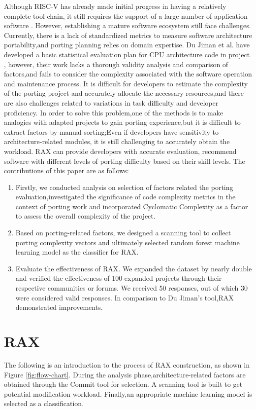 \documentclass[sigconf,screen,review]{acmart}
\begin{document}
Although RISC-V has already made initial progress in having a relatively complete tool chain, it still requires the support of a large number of application software \cite{2019Notary}.
However, establishing a mature software ecosystem still face challenges.
Currently, there is a lack of standardized metrics to measure software architecture portability,and porting planning relies on domain expertise.
Du Jiman et al. have developed a basic statistical evaluation plan for CPU architecture code in project \cite{2023du}, however, their work lacks a thorough validity analysis and comparison of factors,and fails to consider the complexity associated with the software operation and maintenance process.
It is difficult for developers to estimate the complexity of the porting project and accurately allocate the necessary resources,and there are also challenges related to variations in task difficulty and developer proficiency.
In order to solve this problem,one of the methods is to make analogies with adapted projects to gain porting experience,but it is difficult to extract factors by manual sorting;Even if developers have sensitivity to architecture-related modules, it is still challenging to accurately obtain the workload.
RAX can provide developers with accurate evaluation, recommend software with different levels of porting difficulty based on their skill levels.
The contributions of this paper are as follows:
\begin{enumerate}
  \item Firstly, we conducted analysis on selection of factors related the porting evaluation,investigated the significance of code complexity metrics in the context of porting work and incorporated Cyclomatic Complexity as a factor to assess the overall complexity of  the project.
  \item Based on porting-related factors, we designed a scanning tool to collect porting complexity vectors and ultimately selected random forest machine learning model as the classifier for RAX.
  \item Evaluate the effectiveness of RAX.
  We expanded the dataset by nearly double and verified the effectiveness of 100 expanded projects through their respective communities or forums.
  We received 50 responses, out of which 30 were considered valid responses.
  In comparison to Du Jiman's tool,RAX demonstrated  improvements.
\end{enumerate}


\section{RAX}
The following is an introduction to the process of RAX construction, as shown in Figure \ref{fig:flow-chart}.
During the analysis phase,architecture-related factors are obtained through the Commit tool for selection.
A scanning tool is built to get potential modification workload.
Finally,an appropriate machine learning model is selected as a classification.
\end{document}
